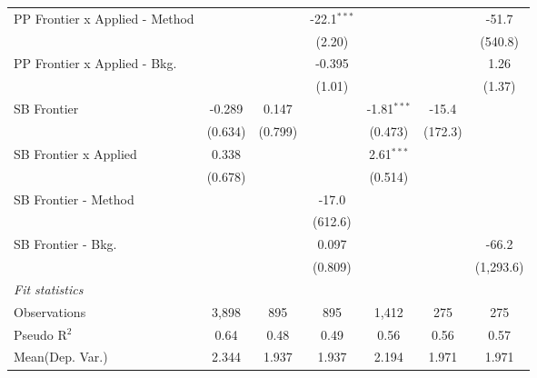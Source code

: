 \begin{tabular}{lcccccc}
   PP Frontier x Applied - Method &                &            & -22.1$^{***}$ &                &              & -51.7\\   
                                  &                &            & (2.20)        &                &              & (540.8)\\   
   PP Frontier x Applied - Bkg.   &                &            & -0.395        &                &              & 1.26\\   
                                  &                &            & (1.01)        &                &              & (1.37)\\   
   SB Frontier                    & -0.289         & 0.147      &               & -1.81$^{***}$  & -15.4        &   \\   
                                  & (0.634)        & (0.799)    &               & (0.473)        & (172.3)      &   \\   
   SB Frontier x Applied          & 0.338          &            &               & 2.61$^{***}$   &              &   \\   
                                  & (0.678)        &            &               & (0.514)        &              &   \\   
   SB Frontier - Method           &                &            & -17.0         &                &              &   \\   
                                  &                &            & (612.6)       &                &              &   \\   
   SB Frontier - Bkg.             &                &            & 0.097         &                &              & -66.2\\   
                                  &                &            & (0.809)       &                &              & (1,293.6)\\   
   \midrule
   \emph{Fit statistics}\\
   Observations                   & 3,898          & 895        & 895           & 1,412          & 275          & 275\\  
   Pseudo R$^2$                   & 0.64           & 0.48       & 0.49          & 0.56           & 0.56         & 0.57\\  
Mean(Dep. Var.) & 2.344 & 1.937 & 1.937 & 2.194 & 1.971 & 1.971 \\
   

\end{tabular}
